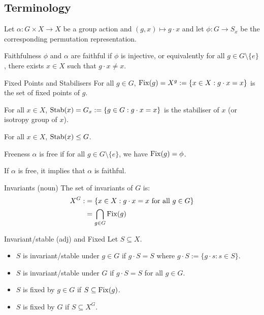 \documentclass{article}
\begin{document}
\subsection{Terminology}
Let $\alpha: G \times X\rightarrow X$ be a group action and $(g,x)\mapsto g\cdot x$ and let $\phi: G\rightarrow S_x$ be the corresponding permutation representation.
\begin{definition}{Faithfulness}
    $\phi$ and $\alpha$ are faithful if $\phi$ is injective, or equivalently for all $g\in G \setminus \{e\}$, there exists $x\in X$ such that $g\cdot x \neq x$.
\end{definition}
\begin{definition}{Fixed Points and Stabilisers}
    For all $g\in G$, $\operatorname{Fix}(g)=X^g:=\{x\in X: g\cdot x=x\}$ is the set of fixed points of $g$.
    \vspace{2mm}

    For all $x\in X$, $\operatorname{Stab}(x)=G_x:=\{g\in G: g\cdot x=x\}$ is the stabiliser of $x$ (or isotropy group of $x$).
\end{definition}
\begin{idea}
    For all $x\in X$, $\operatorname{Stab}(x) \le G$.
\end{idea}
\begin{definition}{Freeness}
    $\alpha$ is free if for all $g\in G \setminus \{e\}$, we have $\operatorname{Fix}(g) = \phi$.
\end{definition}
\begin{idea}
    If $\alpha$ is free, it implies that $\alpha$ is faithful.
\end{idea}
\begin{definition}{Invariants (noun)}
    The set of invariants of $G$ is:
    \begin{align*}
        X^G : & = \{x\in X: g\cdot x=x \text{ for all }g\in G\} \\
              & = \bigcap_{g\in G}\operatorname{Fix}(g)
    \end{align*}
\end{definition}
\begin{definition}{Invariant/stable (adj) and Fixed}
    Let $S \subseteq X$.
    \begin{itemize}
        \item $S$ is invariant/stable under $g\in G$ if $g\cdot S = S$ where $g\cdot S := \{g\cdot s: s\in S\}$.
        \item $S$ is invariant/stable under $G$ if $g\cdot S = S$ for all $g\in G$.
        \item $S$ is fixed by $g\in G$ if $S\subseteq \operatorname{Fix}(g)$.
        \item $S$ is fixed by $G$ if $S\subseteq X^G$.
    \end{itemize}
\end{definition}
\end{document}
